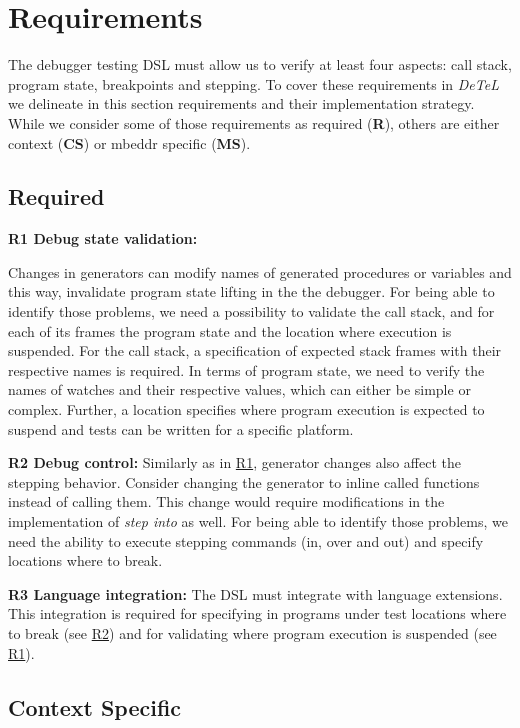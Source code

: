 \section{Requirements}
\label{DesignDecisions}

The debugger testing \ac{DSL} must allow us to verify at least
four aspects: call stack, program state, breakpoints and stepping.
To cover these requirements in \emph{DeTeL} we delineate in this section
requirements and their implementation strategy. While we
consider some of those requirements as required (\textbf{R}), others are either
context (\textbf{CS}) or mbeddr specific (\textbf{MS}).

\subsection{Required}

\textbf{\label{R1}R1 Debug state validation:} 

Changes in generators can modify names of generated procedures or
variables and this way, \eg invalidate program state lifting in the the
debugger.
For being able to identify those problems, we need a  possibility to validate
the call stack, and for each of its frames the program state and the location where
execution is suspended. For the call stack,
a specification of expected stack frames with their respective names is
required. In terms of program state, we need to verify the names of watches 
and their respective values, which can either be simple
or complex. Further, a location specifies where program execution is
expected to suspend and tests can be written for a specific platform. 

\textbf{\label{R2}R2 Debug control:} Similarly as in \hyperref[R1]{R1},
generator changes also affect the stepping behavior. 
Consider changing the  generator to inline called
functions instead of calling them. This change would require modifications in
the implementation of \emph{step into} as well. For being able to identify
those problems, we need the ability to execute stepping commands (in, over
and out) and specify locations where to break.

\textbf{\label{R3}R3 Language integration:} The
\ac{DSL} must integrate with language extensions.
This integration is required for specifying in programs under test
locations where to break (see \hyperref[R2]{R2}) and for validating where
program execution is suspended (see \hyperref[R1]{R1}).

\subsection{Context Specific}


